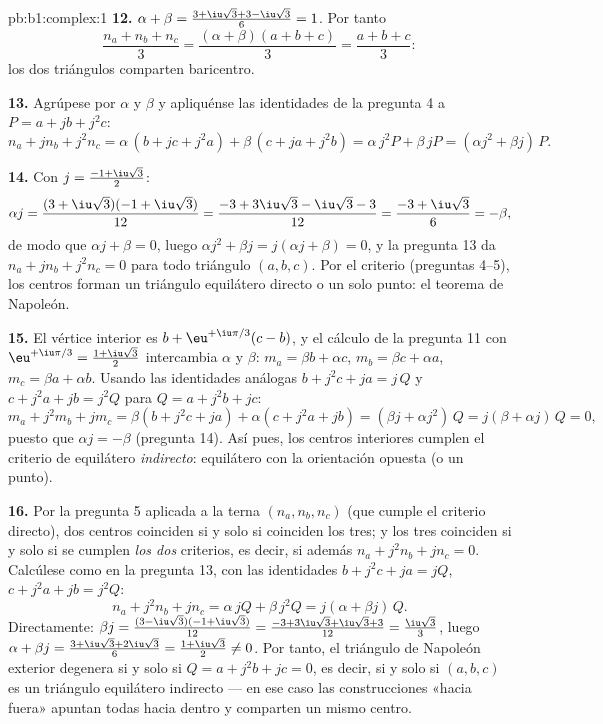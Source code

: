 \begin{solution}{pb:b1:complex:1}
\textbf{12.} $\alpha + \beta = \frac{3 + \iu\sqrt3 + 3 -
\iu\sqrt3}6 = 1$. Por tanto
\[
\frac{n_a + n_b + n_c}3
= \frac{(\alpha + \beta)(a + b + c)}3 = \frac{a + b + c}3 :
\]
los dos triángulos comparten baricentro.

\textbf{13.} Agrúpese por $\alpha$ y $\beta$ y apliquénse las
identidades de la pregunta 4 a $P = a + jb + j^2c$:
\[
n_a + j n_b + j^2 n_c
= \alpha\,(b + jc + j^2 a) + \beta\,(c + ja + j^2 b)
= \alpha\,j^2 P + \beta\,j P
= (\alpha j^2 + \beta j)\,P .
\]

\textbf{14.} Con $j = \frac{-1 + \iu\sqrt3}2$:
\[
\alpha j = \frac{(3 + \iu\sqrt3)(-1 + \iu\sqrt3)}{12}
= \frac{-3 + 3\iu\sqrt3 - \iu\sqrt3 - 3}{12}
= \frac{-3 + \iu\sqrt3}6 = -\beta ,
\]
de modo que $\alpha j + \beta = 0$, luego $\alpha j^2 + \beta j =
j(\alpha j + \beta) = 0$, y la pregunta 13 da $n_a + jn_b + j^2n_c = 0$
para todo triángulo $(a, b, c)$. Por el criterio (preguntas 4--5), los
centros forman un triángulo equilátero directo o un solo punto: el
teorema de Napoleón.

\textbf{15.} El vértice interior es $b + \eu^{+\iu\pi/3}(c - b)$, y el
cálculo de la pregunta 11 con $\eu^{+\iu\pi/3} = \frac{1 +
\iu\sqrt3}2$ intercambia $\alpha$ y $\beta$: $m_a = \beta b + \alpha
c$, $m_b = \beta c + \alpha a$, $m_c = \beta a + \alpha b$. Usando las
identidades análogas $b + j^2c + ja = j\,Q$ y $c + j^2a + jb = j^2 Q$
para $Q = a + j^2b + jc$:
\[
m_a + j^2 m_b + j m_c
= \beta(b + j^2 c + ja) + \alpha(c + j^2 a + jb)
= (\beta j + \alpha j^2)\, Q = j(\beta + \alpha j)\,Q = 0 ,
\]
puesto que $\alpha j = -\beta$ (pregunta 14). Así pues, los centros
interiores cumplen el criterio de equilátero \emph{indirecto}:
equilátero con la orientación opuesta (o un punto).

\textbf{16.} Por la pregunta 5 aplicada a la terna $(n_a, n_b, n_c)$
(que cumple el criterio directo), dos centros coinciden si y solo si
coinciden los tres; y los tres coinciden si y solo si se cumplen
\emph{los dos} criterios, es decir, si además $n_a + j^2 n_b + j n_c =
0$. Calcúlese como en la pregunta 13, con las identidades
$b + j^2c + ja = jQ$, $c + j^2a + jb = j^2Q$:
\[
n_a + j^2 n_b + j n_c
= \alpha\,jQ + \beta\,j^2 Q = j(\alpha + \beta j)\,Q .
\]
Directamente: $\beta j = \frac{(3 -
\iu\sqrt3)(-1 + \iu\sqrt3)}{12} = \frac{-3 + 3\iu\sqrt3 +
\iu\sqrt3 + 3}{12} = \frac{\iu\sqrt3}3$, luego $\alpha + \beta j =
\frac{3 + \iu\sqrt3 + 2\iu\sqrt3}6 = \frac{1 + \iu\sqrt3}2 \neq 0$. Por
tanto, el triángulo de Napoleón exterior degenera si y solo si
$Q = a + j^2b + jc = 0$, es decir, si y solo si $(a, b, c)$ es un
triángulo equilátero indirecto --- en ese caso las construcciones
«hacia fuera» apuntan todas hacia dentro y comparten un mismo centro.


\end{solution}
